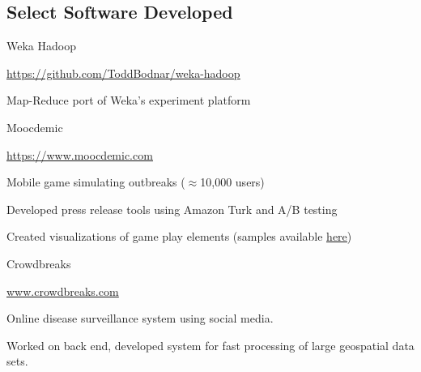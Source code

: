 \documentclass[margin,line]{res}
\newcommand{\linkToUrl}[1]{{\color{blue}\underline{\href{#1}{Link}}}}
\newenvironment{list1}{
  \begin{list}{\ding{113}}{%
      \setlength{\itemsep}{0in}
      \setlength{\parsep}{0in} \setlength{\parskip}{0in}
      \setlength{\topsep}{0in} \setlength{\partopsep}{0in} 
      \setlength{\leftmargin}{0.17in}}}{\end{list}}
\begin{document}
\begin{resume}








\section{\sc Select Software Developed}
Weka Hadoop
\begin{list1}
\item[] \underline{\color{blue} \href{https://github.com/ToddBodnar/weka-hadoop}{https://github.com/ToddBodnar/weka-hadoop}}
\item[] Map-Reduce port of Weka's experiment platform
\end{list1}

Moocdemic
\begin{list1}
\item[] \underline{\color{blue} \href{https://www.moocdemic.com}{https://www.moocdemic.com}}
\item[] Mobile game simulating outbreaks (\(\approx\)10,000 users)
\item[] Developed press release tools using Amazon Turk and A/B testing 
\item[] Created visualizations of game play elements (samples available \underline{\color{blue} \href{http://www.toddbodnar.com/gallery/moocdemic.html}{here}})  
\end{list1}

Crowdbreaks%
\begin{list1}
\item[] \underline{\color{blue} \href{www.crowdbreaks.com}{www.crowdbreaks.com}}
\item[] Online disease surveillance system using social media.
\item[] Worked on back end, developed system for fast processing of large geospatial data sets.
\end{list1}


\end{resume}
\end{document}
